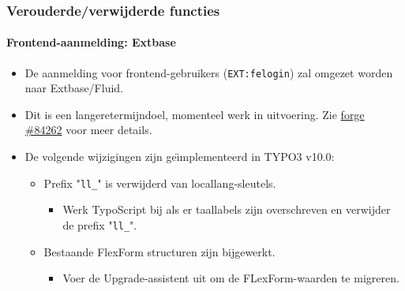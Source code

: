 \begin{frame}[fragile]
	\frametitle{Verouderde/verwijderde functies}
	\framesubtitle{Frontend-aanmelding: Extbase}

	\begin{itemize}
		\item De aanmelding voor frontend-gebruikers (\texttt{EXT:felogin}) zal omgezet worden naar Extbase/Fluid.

		\item Dit is een langeretermijndoel, momenteel werk in uitvoering.\newline
			Zie \href{https://forge.typo3.org/issues/84262}{forge \#84262} voor meer details.

		\item De volgende wijzigingen zijn ge\"{\i}mplementeerd in TYPO3 v10.0:

		\begin{itemize}
			\item[\ding{202}] Prefix "\texttt{ll\_}" is verwijderd van locallang-sleutels.

				\begin{itemize}
					\item[\ding{228}] Werk TypoScript bij als er taallabels zijn overschreven en verwijder de prefix "\texttt{ll\_}".
				\end{itemize}

			\item[\ding{203}] Bestaande FlexForm structuren zijn bijgewerkt.

				\begin{itemize}
					\item[\ding{228}] Voer de Upgrade-assistent uit om de FLexForm-waarden te migreren.
				\end{itemize}

		\end{itemize}

	\end{itemize}

\end{frame}


